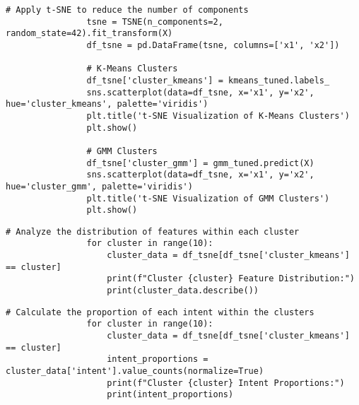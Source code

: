             \vspace{0.5em}

            \begin{lstlisting}[caption={t-SNE Visualization of Clusters}, label={lst:tsne_visualization}]
                # Apply t-SNE to reduce the number of components
                tsne = TSNE(n_components=2, random_state=42).fit_transform(X)
                df_tsne = pd.DataFrame(tsne, columns=['x1', 'x2'])
                
                # K-Means Clusters
                df_tsne['cluster_kmeans'] = kmeans_tuned.labels_
                sns.scatterplot(data=df_tsne, x='x1', y='x2', hue='cluster_kmeans', palette='viridis')
                plt.title('t-SNE Visualization of K-Means Clusters')
                plt.show()
                
                # GMM Clusters
                df_tsne['cluster_gmm'] = gmm_tuned.predict(X)
                sns.scatterplot(data=df_tsne, x='x1', y='x2', hue='cluster_gmm', palette='viridis')
                plt.title('t-SNE Visualization of GMM Clusters')
                plt.show()
            \end{lstlisting}
            
            \vspace{0.5em}

            \begin{lstlisting}[caption={Feature Distribution Analysis by Cluster}, label={lst:feature_distribution}]
                # Analyze the distribution of features within each cluster
                for cluster in range(10):
                    cluster_data = df_tsne[df_tsne['cluster_kmeans'] == cluster]
                    print(f"Cluster {cluster} Feature Distribution:")
                    print(cluster_data.describe())
            \end{lstlisting}
            
            \vspace{0.5em}

            \begin{lstlisting}[caption={Intent Proportions Analysis by Cluster}, label={lst:intent_proportions}]
                # Calculate the proportion of each intent within the clusters
                for cluster in range(10):
                    cluster_data = df_tsne[df_tsne['cluster_kmeans'] == cluster]
                    intent_proportions = cluster_data['intent'].value_counts(normalize=True)
                    print(f"Cluster {cluster} Intent Proportions:")
                    print(intent_proportions)
            \end{lstlisting}
            
